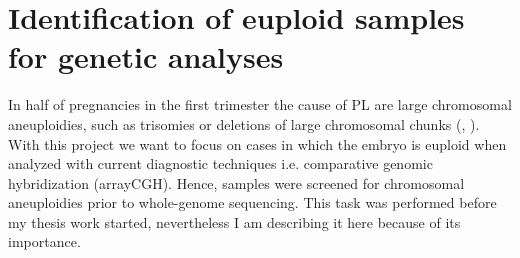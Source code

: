 \documentclass[
tikz,
11pt, %
oneside, %
english, %
singlespacing, %
headsepline, %
]{MastersDoctoralThesisV2} %
\begin{document}

\begingroup 
\obeylines
%
\endgroup%




\section{Identification of euploid samples for genetic analyses}
In half of pregnancies in the first trimester the cause of PL are large chromosomal aneuploidies, such as trisomies or deletions of large chromosomal chunks (\cite{goddijn2000genetic}, \cite{zhang2009genetic}). With this project we want to focus on cases in which the embryo is euploid when analyzed with current diagnostic techniques i.e. comparative genomic hybridization (arrayCGH). Hence, samples were screened for chromosomal aneuploidies prior to whole-genome sequencing. This task was performed before my thesis work started, nevertheless I am describing it here because of its importance. \\
\end{document}
